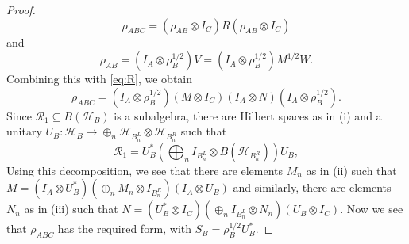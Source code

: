 \documentclass[12pt]{article}
\theoremstyle{definition}
\theoremstyle{remark}
\def\Rr{\mathcal R}
\def\Ha{\mathcal H}
\begin{document}
\begin{proof}
\[
\rho_{ABC}=(\rho_{AB}\otimes I_C)R(\rho_{AB}\otimes I_C)
\]
and 
\[
\rho_{AB}=(I_A\otimes \rho_B^{1/2})V=(I_A\otimes \rho_B^{1/2})M^{1/2}W.
\]
Combining this with \eqref{eq:R}, we obtain
\[
\rho_{ABC}=(I_A\otimes \rho_B^{1/2})(M\otimes I_C)(I_A\otimes N)(I_A\otimes \rho_B^{1/2}).
\]
Since $\Rr_1\subseteq B(\Ha_B)$ is a subalgebra, there are Hilbert spaces as in (i) and a
unitary $U_B:\Ha_B\to \oplus_n \Ha_{B^L_n}\otimes \Ha_{B^R_n}$ such that
\[
\Rr_1=U^*_B\left(\bigoplus_n I_{B^L_n}\otimes B(\Ha_{B^R_n})\right) U_B,
\]
Using this decomposition, we see that there are elements $M_n$ as in (ii) such that 
$M=(I_A\otimes U^*_B)(\oplus_n M_n\otimes I_{B^R_n})(I_A\otimes U_B)$ and similarly, there
are elements $N_n$ as in (iii) such that $N=(U_B^*\otimes I_C)(\oplus_n I_{B^L_n}\otimes
N_n)(U_B\otimes I_C)$. Now we see that $\rho_{ABC}$ has the required form, with
$S_B=\rho^{1/2}_BU^*_B$.


\end{proof}
\end{document}
